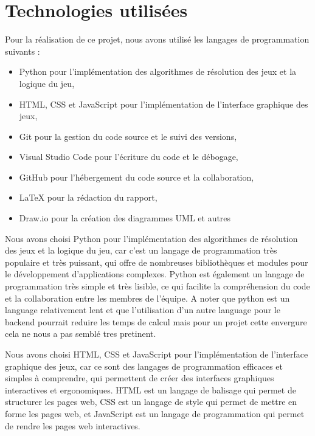 \section{Technologies utilisées}

Pour la réalisation de ce projet, nous avons utilisé les langages de programmation suivants :
\begin{itemize}
	\item Python pour l'implémentation des algorithmes de résolution des jeux et la logique du jeu,
	\item HTML, CSS et JavaScript pour l'implémentation de l'interface graphique des jeux,
	\item Git pour la gestion du code source et le suivi des versions,
	\item Visual Studio Code pour l'écriture du code et le débogage,
	\item GitHub pour l'hébergement du code source et la collaboration,
	\item LaTeX pour la rédaction du rapport,
	\item Draw.io pour la création des diagrammes UML et autres
\end{itemize}

Nous avons choisi Python pour l'implémentation des algorithmes de résolution des 
jeux et la logique du jeu, car c'est un langage de programmation très populaire et 
très puissant, qui offre de nombreuses bibliothèques et modules pour le 
développement d'applications complexes. 
Python est également un langage de programmation très simple et très lisible, 
ce qui facilite la compréhension du code et la collaboration entre les membres de 
l'équipe.
A noter que python est un language relativement lent et que l'utilisation d'un autre
language pour le backend pourrait reduire les temps de calcul mais pour un projet cette envergure
cela ne nous a pas semblé tres pretinent.

Nous avons choisi HTML, CSS et JavaScript pour l'implémentation de l'interface
graphique des jeux, car ce sont des langages de programmation efficaces et 
simples à comprendre, qui permettent de créer des interfaces graphiques interactives 
et ergonomiques. HTML est un langage de balisage qui permet de structurer les pages
web, CSS est un langage de style qui permet de mettre en forme les pages web, et
JavaScript est un langage de programmation qui permet de rendre les pages web
interactives.

